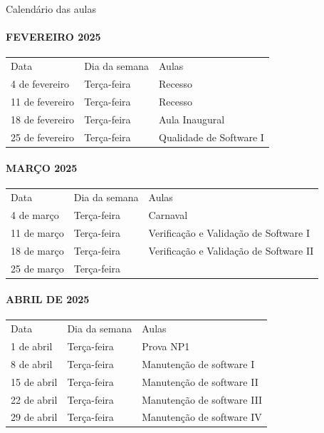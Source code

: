\documentclass[
]{book}
\begin{document}
Calendário das aulas

\paragraph{FEVEREIRO 2025}\label{fevereiro-2025}

\begin{longtable}[]{@{}lll@{}}
\toprule\noalign{}
\endhead
\bottomrule\noalign{}
\endlastfoot
Data & Dia da semana & Aulas \\
4 de fevereiro & Terça-feira & Recesso \\
11 de fevereiro & Terça-feira & Recesso \\
18 de fevereiro & Terça-feira & Aula Inaugural \\
25 de fevereiro & Terça-feira & Qualidade de Software I \\
\end{longtable}

\paragraph{MARÇO 2025}\label{maruxe7o-2025}

\begin{longtable}[]{@{}lll@{}}
\toprule\noalign{}
\endhead
\bottomrule\noalign{}
\endlastfoot
Data & Dia da semana & Aulas \\
4 de março & Terça-feira & Carnaval \\
11 de março & Terça-feira & Verificação e Validação de Software I \\
18 de março & Terça-feira & Verificação e Validação de Software II \\
25 de março & Terça-feira & \\
\end{longtable}

\paragraph{ABRIL DE 2025}\label{abril-de-2025}

\begin{longtable}[]{@{}lll@{}}
\toprule\noalign{}
\endhead
\bottomrule\noalign{}
\endlastfoot
Data & Dia da semana & Aulas \\
1 de abril & Terça-feira & Prova NP1 \\
8 de abril & Terça-feira & Manutenção de software I \\
15 de abril & Terça-feira & Manutenção de software II \\
22 de abril & Terça-feira & Manutenção de software III \\
29 de abril & Terça-feira & Manutenção de software IV \\
\end{longtable}
\end{document}
